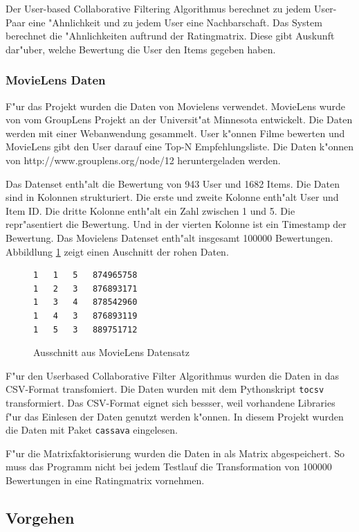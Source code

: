 \documentclass[a4paper, 12pt]{article}
\begin{document}
 Der User-based Collaborative Filtering Algorithmus berechnet zu jedem User-Paar eine "Ahnlichkeit und zu jedem User eine Nachbarschaft. Das System berechnet die "Ahnlichkeiten auftrund der Ratingmatrix. Diese gibt Auskunft dar"uber, welche Bewertung die User den Items gegeben haben.

\subsubsection{MovieLens Daten}
\label{sec:movielens}

F"ur das Projekt wurden die Daten von Movielens verwendet. MovieLens wurde von vom GroupLens Projekt an der Universit"at Minnesota entwickelt. Die Daten werden mit einer Webanwendung gesammelt. User k"onnen Filme bewerten und MovieLens gibt den User darauf eine Top-N Empfehlungsliste. Die Daten k"onnen von http://www.grouplens.org/node/12 heruntergeladen werden. 

Das Datenset enth"alt die Bewertung von 943 User und 1682 Items. Die Daten sind in Kolonnen strukturiert. Die erste und zweite Kolonne enth"alt User und Item ID. Die dritte Kolonne enth"alt ein Zahl zwischen 1 und 5. Die repr"asentiert die Bewertung. Und in der vierten Kolonne ist ein Timestamp der Bewertung. Das Movielens Datenset enth"alt insgesamt 100000 Bewertungen. Abbildlung \ref{fig:movielens} zeigt einen Auschnitt der rohen Daten.

\begin{figure}
\centering
\begin{verbatim}
1	1	5	874965758
1	2	3	876893171
1	3	4	878542960
1	4	3	876893119
1	5	3	889751712
\end{verbatim}
\caption{Ausschnitt aus MovieLens Datensatz}
\label{fig:movielens}
\end{figure}

F"ur den Userbased Collaborative Filter Algorithmus wurden die Daten in das CSV-Format transfomiert. Die Daten wurden mit dem Pythonskript \verb|tocsv| transformiert. Das CSV-Format eignet sich bessser, weil vorhandene Libraries f"ur das Einlesen der Daten genutzt werden k"onnen. In diesem Projekt wurden die Daten mit Paket \verb|cassava| eingelesen.

F"ur die Matrixfaktorisierung wurden die Daten in als Matrix abgespeichert. So muss das Programm nicht bei jedem Testlauf die Transformation von 100000 Bewertungen in eine Ratingmatrix vornehmen.

\subsection{Vorgehen}
\label{sec:procedure}
\end{document}
